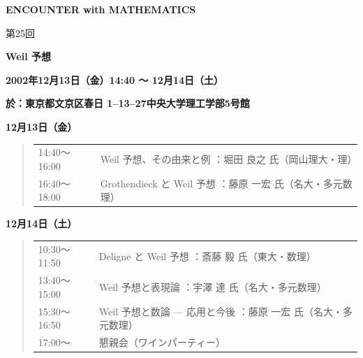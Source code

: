 \documentclass[uplatex,dvipdfmx]{jlreq}
\begin{document}
\begin{center}
  \vspace*{20pt}
  {\Huge\bfseries ENCOUNTER with MATHEMATICS}

  \vspace{10pt}
  {\huge 第25回}

  \vspace{10pt}
  {\Huge\bfseries Weil 予想}
\end{center}

\vspace{20pt}

\noindent
{\large\bfseries 2002年12月13日（金）14:40 〜 12月14日（土）}

\vspace{5pt}
\noindent
{\bfseries 於：東京都文京区春日 1--13--27\quad 中央大学理工学部5号館}

\vspace{10pt}

\noindent\textbf{12月13日（金）}
\begin{quote}
  \begin{tabular}{@{}ll@{}}
    14:40〜16:00 & Weil 予想、その由来と例
                   \hfill：堀田 良之 氏（岡山理大・理） \\[4pt]
    16:40〜18:00 & Grothendieck と Weil 予想
                   \hfill：藤原 一宏 氏（名大・多元数理） \\
  \end{tabular}
\end{quote}

\noindent\textbf{12月14日（土）}
\begin{quote}
  \begin{tabular}{@{}ll@{}}
    10:30〜11:50 & Deligne と Weil 予想
                   \hfill：斎藤 毅 氏（東大・数理） \\[4pt]
    13:40〜15:00 & Weil 予想と表現論
                   \hfill：宇澤 達 氏（名大・多元数理） \\[4pt]
    15:30〜16:50 & Weil 予想と数論 --- 応用と今後
                   \hfill：藤原 一宏 氏（名大・多元数理） \\[4pt]
    17:00〜      & 懇親会（ワインパーティー） \\
  \end{tabular}
\end{quote}

\vspace{5pt}
\end{document}

